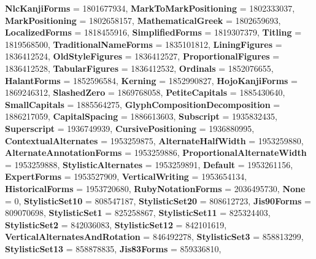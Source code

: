 \begin{DoxyCompactItemize}
\newline
{\bfseries Nlc\+Kanji\+Forms} = 1801677934, 
{\bfseries Mark\+To\+Mark\+Positioning} = 1802333037, 
{\bfseries Mark\+Positioning} = 1802658157, 
{\bfseries Mathematical\+Greek} = 1802659693, 
\newline
{\bfseries Localized\+Forms} = 1818455916, 
{\bfseries Simplified\+Forms} = 1819307379, 
{\bfseries Titling} = 1819568500, 
{\bfseries Traditional\+Name\+Forms} = 1835101812, 
\newline
{\bfseries Lining\+Figures} = 1836412524, 
{\bfseries Old\+Style\+Figures} = 1836412527, 
{\bfseries Proportional\+Figures} = 1836412528, 
{\bfseries Tabular\+Figures} = 1836412532, 
\newline
{\bfseries Ordinals} = 1852076655, 
{\bfseries Halant\+Forms} = 1852596584, 
{\bfseries Kerning} = 1852990827, 
{\bfseries Hojo\+Kanji\+Forms} = 1869246312, 
\newline
{\bfseries Slashed\+Zero} = 1869768058, 
{\bfseries Petite\+Capitals} = 1885430640, 
{\bfseries Small\+Capitals} = 1885564275, 
{\bfseries Glyph\+Composition\+Decomposition} = 1886217059, 
\newline
{\bfseries Capital\+Spacing} = 1886613603, 
{\bfseries Subscript} = 1935832435, 
{\bfseries Superscript} = 1936749939, 
{\bfseries Cursive\+Positioning} = 1936880995, 
\newline
{\bfseries Contextual\+Alternates} = 1953259875, 
{\bfseries Alternate\+Half\+Width} = 1953259880, 
{\bfseries Alternate\+Annotation\+Forms} = 1953259886, 
{\bfseries Proportional\+Alternate\+Width} = 1953259888, 
\newline
{\bfseries Stylistic\+Alternates} = 1953259891, 
{\bfseries Default} = 1953261156, 
{\bfseries Expert\+Forms} = 1953527909, 
{\bfseries Vertical\+Writing} = 1953654134, 
\newline
{\bfseries Historical\+Forms} = 1953720680, 
{\bfseries Ruby\+Notation\+Forms} = 2036495730, 
{\bfseries None} = 0, 
{\bfseries Stylistic\+Set10} = 808547187, 
\newline
{\bfseries Stylistic\+Set20} = 808612723, 
{\bfseries Jis90\+Forms} = 809070698, 
{\bfseries Stylistic\+Set1} = 825258867, 
{\bfseries Stylistic\+Set11} = 825324403, 
\newline
{\bfseries Stylistic\+Set2} = 842036083, 
{\bfseries Stylistic\+Set12} = 842101619, 
{\bfseries Vertical\+Alternates\+And\+Rotation} = 846492278, 
{\bfseries Stylistic\+Set3} = 858813299, 
\newline
{\bfseries Stylistic\+Set13} = 858878835, 
{\bfseries Jis83\+Forms} = 859336810, 

\end{DoxyCompactItemize}
